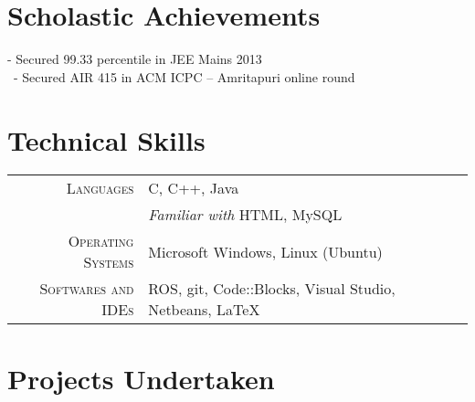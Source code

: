 \documentclass[a4paper,10pt]{extarticle} %
\begin{document}
\section{Scholastic Achievements}

{\hspace{0.5cm}- Secured 99.33 percentile in JEE Mains 2013}\hspace{3.8cm}{- Secured 98.11 percentile in JEE Advanced 2013}\\\
{\hspace*{0.5cm}- Secured AIR 415 in ACM ICPC – Amritapuri online round}


\section{Technical Skills}

\begin{tabular}{r|p{16cm}}
\textsc{Languages} & C, C++, Java\\
& {\itshape{Familiar with}} HTML, MySQL\\
\textsc{Operating Systems} &  Microsoft Windows, Linux (Ubuntu)\\
\textsc{Softwares and IDEs} & ROS, git, Code::Blocks, Visual Studio, Netbeans, \LaTeX\\
\end{tabular}



\section{Projects Undertaken}
\end{document}
